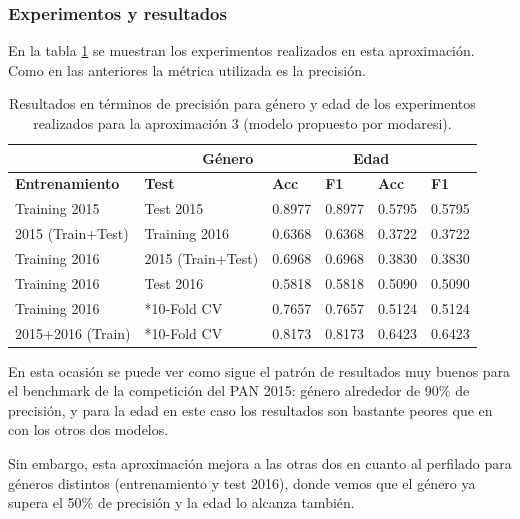 \subsubsection{Experimentos y resultados}
En la tabla \ref{tab:results_aprox3} se muestran los experimentos realizados en esta aproximación. Como en las anteriores la métrica utilizada es la precisión.

\begin{table}[hp!]
    \centering
    {
    \setlength{\tabcolsep}{0.6\tabcolsep}

    \begin{tabular}{|l|l|ll|ll|}
        \hhline{------}
        \rowcolor{udcpink!25}
          \multicolumn{2}{|c|}{Dataset} & \multicolumn{2}{c|}{Género} & \multicolumn{2}{c|}{Edad} \\ \hline
        \textbf{Entrenamiento} & \textbf{Test} & \textbf{Acc} & \textbf{F1} & \textbf{Acc} & \textbf{F1}\\ \hline
        Training 2015 & Test 2015 & 0.8977 & 0.8977 & 0.5795 & 0.5795 \\
        2015 (Train+Test) & Training 2016 & 0.6368 & 0.6368 & 0.3722 & 0.3722\\
        Training 2016 & 2015 (Train+Test) & 0.6968 & 0.6968 & 0.3830 & 0.3830 \\
        Training 2016 & Test 2016 & 0.5818 & 0.5818 & 0.5090 & 0.5090 \\
        Training 2016 & *10-Fold CV & 0.7657 & 0.7657 & 0.5124 & 0.5124 \\
        2015+2016 (Train) & *10-Fold CV & 0.8173 & 0.8173 & 0.6423 & 0.6423\\ \hline
    \end{tabular}%
    }
    \caption{Resultados en términos de precisión para género y edad de los experimentos realizados para la aproximación 3 (modelo propuesto por modaresi).}
    \label{tab:results_aprox3}
\end{table}

En esta ocasión se puede ver como sigue el patrón de resultados muy buenos para el benchmark de la competición del PAN 2015: género alrededor de 90\% de precisión, y para la edad en este caso los resultados son bastante peores que en con los otros dos modelos.

Sin embargo, esta aproximación mejora a las otras dos en cuanto al perfilado para géneros distintos (entrenamiento y test 2016), donde vemos que el género ya supera el 50\% de precisión y la edad lo alcanza también.

